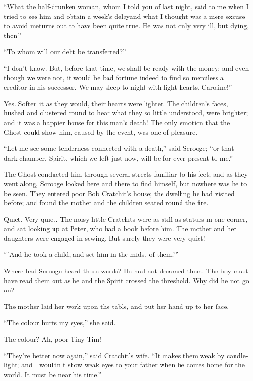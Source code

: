 \documentclass[paper=5.5in:8.5in,BCOR=10mm,twoside,DIV=15,12pt,usegeometry,openany]{scrbook} %
\begin{document}
\enquote{What the half-drunken woman, whom I told you of last night, said to me when I tried to see him and obtain a week's delay\textemdash and what I thought was a mere excuse to avoid me\textemdash turns out to have been quite true. He was not only very ill, but dying, then.}

\enquote{To whom will our debt be transferred?}

\enquote{I don't know. But, before that time, we shall be ready with the money; and even though we were not, it would be bad fortune indeed to find so merciless a creditor in his successor. We may sleep to-night with light hearts, Caroline!}

Yes. Soften it as they would, their hearts were lighter. The children's faces, hushed and clustered round to hear what they so little understood, were brighter; and it was a happier house for this man's death! The only emotion that the Ghost could show him, caused by the event, was one of pleasure.

\enquote{Let me see some tenderness connected with a death,} said Scrooge; \enquote{or that dark chamber, Spirit, which we left just now, will be for ever present to me.}

The Ghost conducted him through several streets familiar to his feet; and as they went along, Scrooge looked here and there to find himself, but nowhere was he to be seen. They entered poor Bob Cratchit's house; the dwelling he had visited before; and found the mother and the children seated round the fire.

Quiet. Very quiet. The noisy little Cratchits were as still as statues in one corner, and sat looking up at Peter, who had a book before him. The mother and her daughters were engaged in sewing. But surely they were very quiet!

\enquote{\enquote{And he took a child, and set him in the midst of them.}}

Where had Scrooge heard those words? He had not dreamed them. The boy must have read them out as he and the Spirit crossed the threshold. Why did he not go on?

The mother laid her work upon the table, and put her hand up to her face.

\enquote{The colour hurts my eyes,} she said.

The colour? Ah, poor Tiny Tim!

\enquote{They're better now again,} said Cratchit's wife. \enquote{It makes them weak by candle-light; and I wouldn't show weak eyes to your father when he comes home for the world. It must be near his time.}
\end{document}
